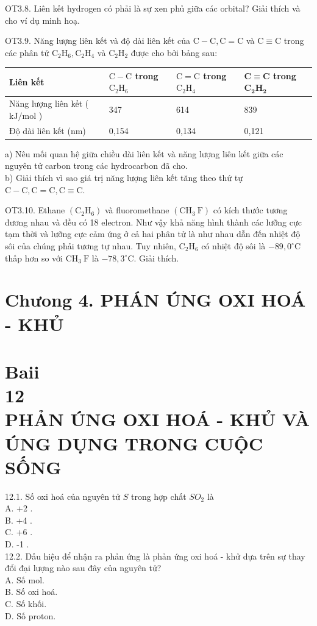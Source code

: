 \documentclass[10pt]{article}
\begin{document}
OT3.8. Liên kết hydrogen có phải là sự xen phủ giữa các orbital? Giải thích và cho ví dụ minh hoạ.

OT3.9. Năng lượng liên kết và độ dài liên kết của $\mathrm{C}-\mathrm{C}, \mathrm{C}=\mathrm{C}$ và $\mathrm{C} \equiv \mathrm{C}$ trong các phân tử $\mathrm{C}_{2} \mathrm{H}_{6}, \mathrm{C}_{2} \mathrm{H}_{4}$ và $\mathrm{C}_{2} \mathrm{H}_{2}$ được cho bởi bảng sau:

\begin{center}
\begin{tabular}{|l|l|l|l|}
\hline
Liên kết & $\mathrm{C}-\mathrm{C}$ trong $\mathrm{C}_{2} \mathrm{H}_{6}$ & $\mathrm{C}=\mathrm{C}$ trong $\mathrm{C}_{2} \mathrm{H}_{4}$ & $\mathbf{C \equiv C}$ trong $\mathbf{C}_{\mathbf{2}} \mathbf{H}_{\mathbf{2}}$ \\
\hline
Năng lượng liên kết ( $\mathrm{kJ} / \mathrm{mol}$ ) & 347 & 614 & 839 \\
\hline
Độ dài liên kết (nm) & 0,154 & 0,134 & 0,121 \\
\hline
\end{tabular}
\end{center}

a) Nêu mối quan hệ giữa chiều dài liên kết và năng lượng liên kết giữa các nguyên tử carbon trong các hydrocarbon đã cho.\\
b) Giải thích vì sao giá trị năng lượng liên kết tăng theo thứ tự $\mathrm{C}-\mathrm{C}, \mathrm{C}=\mathrm{C}, \mathrm{C} \equiv \mathrm{C}$.

OT3.10. Ethane $\left(\mathrm{C}_{2} \mathrm{H}_{6}\right)$ và fluoromethane $\left(\mathrm{CH}_{3} \mathrm{~F}\right)$ có kích thước tương đương nhau và đều có 18 electron. Như vậy khả năng hình thành các lưỡng cực tạm thời và lưỡng cực cảm ứng ở cả hai phân tử là như nhau dẫn đến nhiệt độ sôi của chúng phải tương tự nhau. Tuy nhiên, $\mathrm{C}_{2} \mathrm{H}_{6}$ có nhiệt độ sôi là $-89,0^{\circ} \mathrm{C}$ thấp hơn so với $\mathrm{CH}_{3} \mathrm{~F}$ là $-78,3^{\circ} \mathrm{C}$. Giải thích.

\section*{Chưong 4. PHÁN ÚNG OXI HOÁ - KHỦ}
\section*{Baii \\
 12 \\
 PHẢN ÚNG OXI HOÁ - KHỦ VÀ ÚNG DỤNG TRONG CUỘC SỐNG}
12.1. Số oxi hoá của nguyên tử $S$ trong hợp chất $S O_{2}$ là\\
A. +2 .\\
B. +4 .\\
C. +6 .\\
D. -1 .\\
12.2. Dấu hiệu để nhận ra phản ứng là phản ứng oxi hoá - khử dựa trên sự thay đổi đại lượng nào sau đây của nguyên tử?\\
A. Số mol.\\
B. Số oxi hoá.\\
C. Số khối.\\
D. Số proton.
\end{document}

